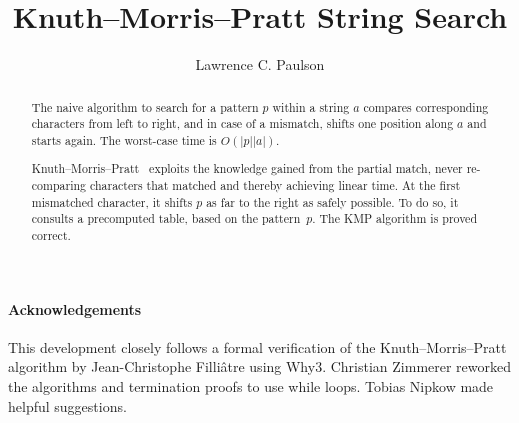\documentclass[11pt,a4paper]{article}
\newcommand{\lenarray}[1]{|#1|}
\begin{document}
\title{Knuth--Morris--Pratt String Search}
\author{Lawrence C. Paulson}
\maketitle

\begin{abstract}
The naive algorithm to search for a pattern $p$ within a string $a$ compares
corresponding characters from left to right, and in case of a mismatch,
shifts one position along $a$ and starts again. 
The worst-case time is $O(\lenarray{p}\lenarray{a})$. 

Knuth--Morris--Pratt~\cite{knuth-fast-pattern} 
exploits the knowledge gained from the partial match, 
never re-comparing characters that matched and thereby achieving linear time. 
At the first mismatched character,
it shifts $p$ as far to the right as safely possible. To do so, it consults a
precomputed table, based on the pattern~$p$. The KMP algorithm is proved correct. 
\end{abstract}

\newpage
\tableofcontents

\paragraph*{Acknowledgements}
This development closely follows a formal verification of 
the Knuth--Morris--Pratt algorithm by Jean-Christophe Filliâtre using Why3.
Christian Zimmerer reworked the algorithms and termination proofs to use while loops.
Tobias Nipkow made helpful suggestions.

\newpage





\end{document}

